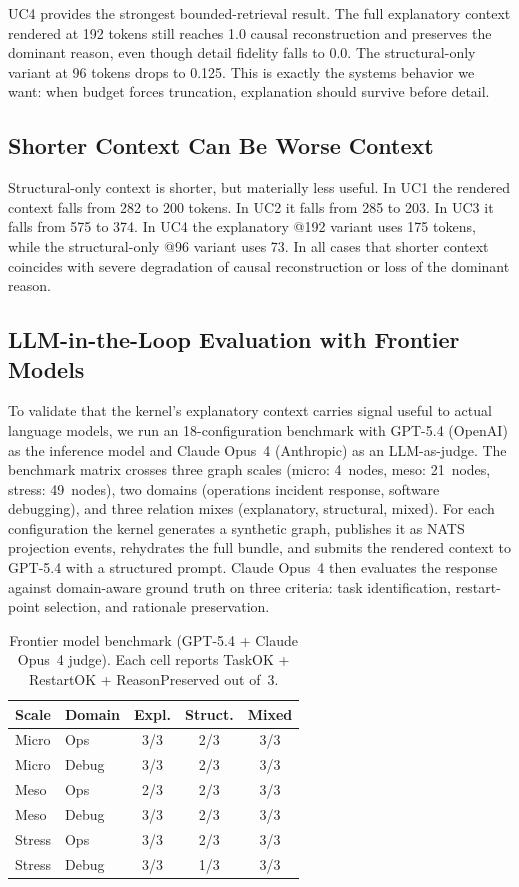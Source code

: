 \documentclass[11pt]{article}
\begin{document}
UC4 provides the strongest bounded-retrieval result. The full explanatory
context rendered at \mbox{192} tokens still reaches \mbox{1.0} causal
reconstruction and preserves the dominant reason, even though detail fidelity
falls to \mbox{0.0}. The structural-only variant at \mbox{96} tokens drops to
\mbox{0.125}. This is exactly the systems behavior we want: when budget forces
truncation, explanation should survive before detail.

\subsection{Shorter Context Can Be Worse Context}

Structural-only context is shorter, but materially less useful. In UC1 the
rendered context falls from 282 to 200 tokens. In UC2 it falls from 285 to 203.
In UC3 it falls from 575 to 374. In UC4 the explanatory \mbox{@192} variant
uses 175 tokens, while the structural-only \mbox{@96} variant uses 73. In all
cases that shorter context coincides with severe degradation of causal
reconstruction or loss of the dominant reason.

\subsection{LLM-in-the-Loop Evaluation with Frontier Models}

To validate that the kernel's explanatory context carries signal useful to
actual language models, we run an 18-configuration benchmark with GPT-5.4
(OpenAI) as the inference model and Claude Opus~4 (Anthropic) as an
LLM-as-judge. The benchmark matrix crosses three graph scales (micro: 4~nodes,
meso: 21~nodes, stress: 49~nodes), two domains (operations incident response,
software debugging), and three relation mixes (explanatory, structural, mixed).
For each configuration the kernel generates a synthetic graph, publishes it as
NATS projection events, rehydrates the full bundle, and submits the rendered
context to GPT-5.4 with a structured prompt. Claude Opus~4 then evaluates the
response against domain-aware ground truth on three criteria: task
identification, restart-point selection, and rationale preservation.

\begin{table}[h]
\centering\small
\begin{tabular}{llccc}
\toprule
Scale & Domain & Expl. & Struct. & Mixed \\
\midrule
Micro & Ops    & 3/3 & 2/3 & 3/3 \\
Micro & Debug  & 3/3 & 2/3 & 3/3 \\
Meso  & Ops    & 2/3 & 2/3 & 3/3 \\
Meso  & Debug  & 3/3 & 2/3 & 3/3 \\
Stress & Ops   & 3/3 & 2/3 & 3/3 \\
Stress & Debug & 3/3 & 1/3 & 3/3 \\
\bottomrule
\end{tabular}
\caption{Frontier model benchmark (GPT-5.4 + Claude Opus~4 judge). Each cell
reports TaskOK + RestartOK + ReasonPreserved out of~3.}
\label{tab:frontier}
\end{table}
\end{document}
